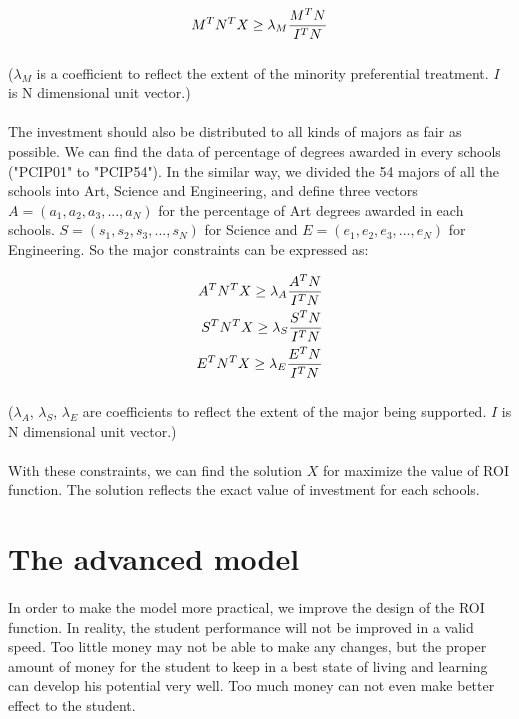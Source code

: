 \documentclass{mcmthesis}
\begin{document}
\begin{align}
M^T\*N^T\*X\geq\lambda_M\*\frac{M^T\*N}{I^T\*N}
\end{align}

\subparagraph{} ($\lambda_M$ is a coefficient to reflect the extent of the minority preferential treatment. $I$ is N dimensional unit vector.)
 
\paragraph{} The investment should also be distributed to all kinds of majors as fair as possible. We can find the data of percentage of degrees awarded in every schools ("PCIP01" to "PCIP54"). In the similar way, we divided the 54 majors of all the schools into Art, Science and Engineering, and define three vectors $A=(a_1, a_2, a_3, ..., a_N)$ for the percentage of Art degrees awarded in each schools. $S=(s_1, s_2, s_3, ..., s_N)$ for Science and $E=(e_1, e_2, e_3, ..., e_N)$ for Engineering. So the  major constraints can be expressed as:

\begin{align}
A^T\*N^T\*X\geq\lambda_A\*\frac{A^T\*N}{I^T\*N}\\
S^T\*N^T\*X\geq\lambda_S\*\frac{S^T\*N}{I^T\*N}\\
E^T\*N^T\*X\geq\lambda_E\*\frac{E^T\*N}{I^T\*N}\\
\end{align}

\subparagraph{} ($\lambda_A$, $\lambda_S$, $\lambda_E$ are coefficients to reflect the extent of the major being supported. $I$ is N dimensional unit vector.)
\paragraph{} With these constraints, we can find the solution $X$ for maximize the value of ROI function. The solution reflects the exact value of investment for each schools. 

\section{The advanced model} 
\paragraph{} In order to make the model more practical, we improve the design of the ROI function. In reality, the student performance will not be improved in a valid speed. Too little money may not be able to make any changes, but the proper amount of money for the student to keep in a best state of living and learning can develop his potential very well. Too much money can not even make better effect to the student.
\end{document}
